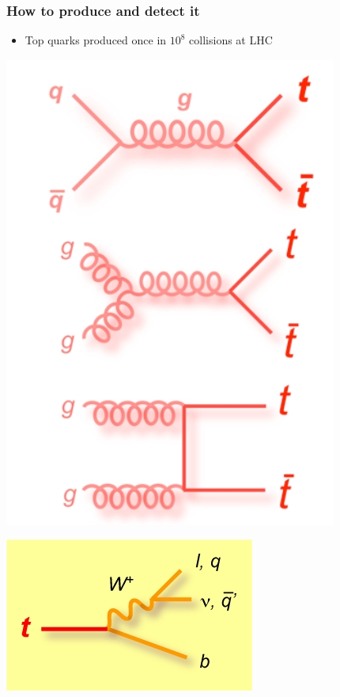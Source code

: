 \documentclass[9pt, xcolor=dvipsnames]{beamer}
\begin{document}
\begin{frame}
 \frametitle{How to produce and detect it}
\begin{itemize}
 \item Top quarks produced once in $10^8$ collisions at LHC
\end{itemize}
\begin{minipage}{.5\columnwidth}
\begin{center}
 \includegraphics[scale=0.3]{topr}
\end{center}
\end{minipage}
\begin{minipage}{.4\columnwidth}
 \includegraphics[scale=0.3]{top}
 

\end{minipage}
\end{frame}
\end{document}
